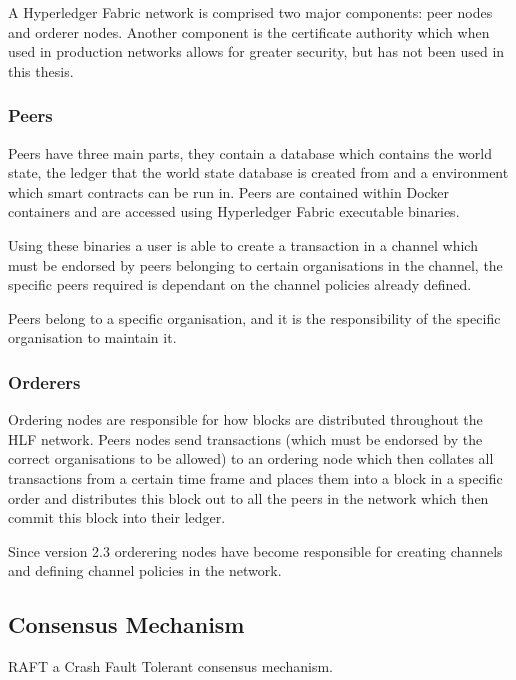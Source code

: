 A Hyperledger Fabric network is comprised two major components: peer nodes and orderer nodes. Another component is the certificate authority which when used in production networks allows for greater security, but has not been used in this thesis.


\subsubsection{Peers}
    
Peers have three main parts, they contain a database which contains the world state, the ledger that the world state database is created from and a environment which smart contracts can be run in. Peers are contained within Docker containers and are accessed using Hyperledger Fabric executable binaries.

Using these binaries a user is able to create a transaction in a channel which must be endorsed by peers belonging to certain organisations in the channel, the specific peers required is dependant on the channel policies already defined.

Peers belong to a specific organisation, and it is the responsibility of the specific organisation to maintain it.

\subsubsection{Orderers}

Ordering nodes are responsible for how blocks are distributed throughout the HLF network. Peers nodes send transactions (which must be endorsed by the correct organisations to be allowed) to an ordering node which then collates all transactions from a certain time frame and places them into a block in a specific order and distributes this block out to all the peers in the network which then commit this block into their ledger.

Since version 2.3 orderering nodes have become responsible for creating channels and defining channel policies in the network.

\subsection{Consensus Mechanism}

RAFT a Crash Fault Tolerant consensus mechanism. 

